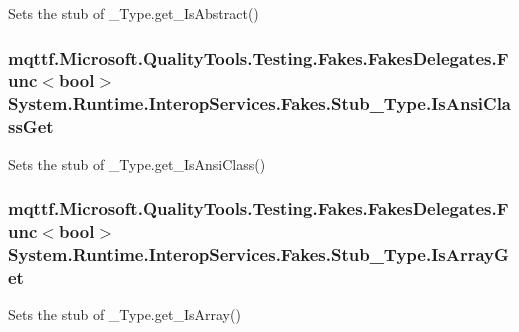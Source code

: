 Sets the stub of \-\_\-\-Type.\-get\-\_\-\-Is\-Abstract()

\hypertarget{class_system_1_1_runtime_1_1_interop_services_1_1_fakes_1_1_stub___type_abc0b335506efb56409585aaf6f489833}{
\subsubsection[{Is\-Ansi\-Class\-Get}]{\setlength{\rightskip}{0pt plus 5cm}mqttf.\-Microsoft.\-Quality\-Tools.\-Testing.\-Fakes.\-Fakes\-Delegates.\-Func$<$bool$>$ System.\-Runtime.\-Interop\-Services.\-Fakes.\-Stub\-\_\-\-Type.\-Is\-Ansi\-Class\-Get}}\label{class_system_1_1_runtime_1_1_interop_services_1_1_fakes_1_1_stub___type_abc0b335506efb56409585aaf6f489833}


Sets the stub of \-\_\-\-Type.\-get\-\_\-\-Is\-Ansi\-Class()

\hypertarget{class_system_1_1_runtime_1_1_interop_services_1_1_fakes_1_1_stub___type_aee932b8f443e1f1d9d188164e9e383c2}{
\subsubsection[{Is\-Array\-Get}]{\setlength{\rightskip}{0pt plus 5cm}mqttf.\-Microsoft.\-Quality\-Tools.\-Testing.\-Fakes.\-Fakes\-Delegates.\-Func$<$bool$>$ System.\-Runtime.\-Interop\-Services.\-Fakes.\-Stub\-\_\-\-Type.\-Is\-Array\-Get}}\label{class_system_1_1_runtime_1_1_interop_services_1_1_fakes_1_1_stub___type_aee932b8f443e1f1d9d188164e9e383c2}


Sets the stub of \-\_\-\-Type.\-get\-\_\-\-Is\-Array()

